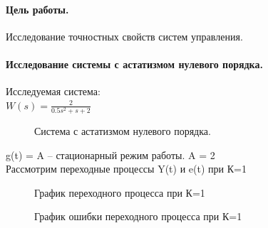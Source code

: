 \documentclass[a4paper, 11pt]{article}
\begin{document}
 
\paragraph{Цель работы.}Исследование точностных свойств систем управления.
\paragraph{Исследование системы с астатизмом нулевого порядка.}Исследуемая система:\\
\large{$W(s)= \frac {2} {0.5s^2+s+2}$}

\begin{figure}[h]
    \caption{Система с астатизмом нулевого порядка.}
    \label{one}
\end{figure}

g(t) = A – стационарный режим работы. A = 2\\

Рассмотрим переходные процессы Y(t) и e(t) при К=1

\begin{figure}[h!]
    \caption{График переходного процесса при К=1}
    \label{two}
\end{figure}



\begin{figure}[h!]
    \caption{График ошибки переходного процесса при К=1}
    \label{tree}
\end{figure}
\end{document}

